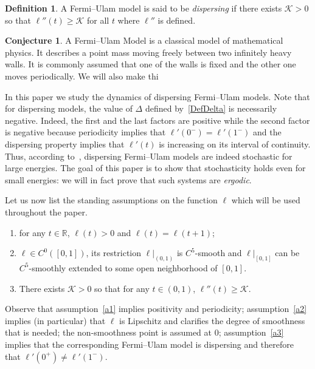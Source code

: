 \documentclass[10pt]{amsart}
\theoremstyle{definition}\newtheorem{defi}[theo]{Definition}\newtheorem{rema}[theo]{Remark}\newtheorem{exam}[theo]{Example}\newtheorem{exem}[theo]{Example}\newtheorem{nota}[theo]{Notation}
\newcommand{\bR}{\mathbb{R}}
\newcommand{\cK}{\mathcal{K}}
\newtheorem{conjl}{Conjecture}
\newcommand*{\relabel}{\renewcommand{\labelenumi}{(\theenumi)}}
\newcommand*{\aenumi}{\renewcommand*{\theenumi}{a\arabic{enumi}}\relabel}
\begin{document}
\begin{defi}\label{def:dispersingFUM}
A Fermi--Ulam model is said to be \emph{dispersing} if there exists $\cK>0$ so that $\ell''(t)\geq \cK$ for all $t$ where $\ell''$ is defined.
\end{defi}

\begin{conjl}
A Fermi--Ulam Model is a classical model of mathematical physics. It describes a point mass moving freely between two infinitely heavy walls. It is commonly assumed that one of the walls is fixed and the other one moves periodically. We will also make thi
\end{conjl}

In this paper we study the dynamics of dispersing Fermi--Ulam models. Note that for dispersing models, the value of $\Delta$ defined by~\eqref{DefDelta} is necessarily negative. Indeed, the first and the last factors are positive while the second factor is negative because periodicity implies that $\ell'(0^{-})=\ell'(1^{-})$ and the dispersing property implies that $\ell'(t)$ is increasing on its interval of continuity. Thus, according to~\cite{fum}, dispersing Fermi--Ulam models are indeed stochastic for large energies. The goal of this paper is to show that stochasticity holds even for small energies: we will in fact prove that such systems are \emph{ergodic}.

Let us now list the standing assumptions on the function $\ell$ which will be used throughout the paper.
\begin{enumerate}\aenumi
\item\label{a1} for any $t\in\bR$, $\ell(t) > 0$ and $\ell(t) = \ell(t+1)$;
\item\label{a2} $\ell\in C^{0}([0,1])$, its restriction $\ell|_{(0,1)}$ is $C^5$-smooth and $\ell|_{[0,1]}$ can be $C^{5}$-smoothly extended to some open neighborhood of $[0,1]$.
\item\label{a3} There exists $\cK > 0$ so that for any $t\in(0,1)$, $\ell''(t) \ge \cK$.
\end{enumerate}
Observe that assumption~\eqref{a1} implies positivity and periodicity; assumption~\eqref{a2} implies (in particular) that $\ell$ is Lipschitz and clarifies the degree of smoothness that is needed; the non-smoothness point is assumed at $0$; assumption~\eqref{a3} implies that the corresponding Fermi--Ulam model is dispersing and therefore that $\ell'(0^{+})\neq\ell'(1^{-})$.
\end{document}
